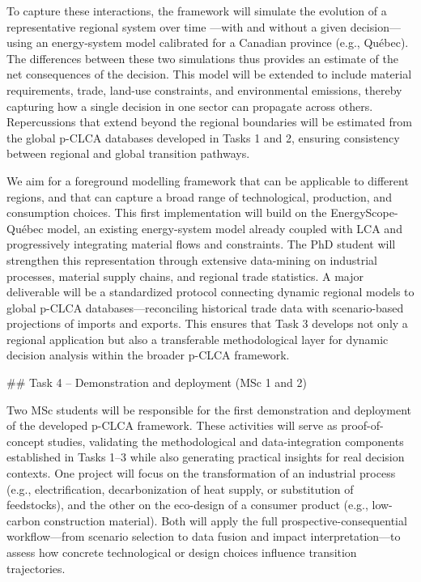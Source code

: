 \documentclass[compact]{nserc} %
\begin{document}
\begin{markdown}
To capture these interactions, the framework will simulate the evolution of a representative regional system over time ---with and without a given decision--- using an energy-system model calibrated for a Canadian province (e.g., Québec). The differences between these two simulations thus provides an estimate of the net consequences of the decision. This model will be extended to include material requirements, trade, land-use constraints, and environmental emissions, thereby capturing how a single decision in one sector can propagate across others. Repercussions that extend beyond the regional boundaries will be estimated from the global p-CLCA databases developed in Tasks 1 and 2, ensuring consistency between regional and global transition pathways.

We aim for a foreground modelling framework that can be applicable to different regions, and that can capture a broad range of technological, production, and consumption choices. This first implementation will build on the EnergyScope-Québec model, an existing energy-system model already coupled with LCA and progressively integrating material flows and constraints. The PhD student will strengthen this representation through extensive data-mining on industrial processes, material supply chains, and regional trade statistics. A major deliverable will be a standardized protocol connecting dynamic regional models to global p-CLCA databases—reconciling historical trade data with scenario-based projections of imports and exports. This ensures that Task 3 develops not only a regional application but also a transferable methodological layer for dynamic decision analysis within the broader p-CLCA framework.


## Task 4 -- Demonstration and deployment (MSc 1 and 2)

Two MSc students will be responsible for the first demonstration and deployment of the developed p-CLCA framework. These activities will serve as proof-of-concept studies, validating the methodological and data-integration components established in Tasks 1–3 while also generating practical insights for real decision contexts. One project will focus on the transformation of an industrial process (e.g., electrification, decarbonization of heat supply, or substitution of feedstocks), and the other on the eco-design of a consumer product (e.g., low-carbon construction material). Both will apply the full prospective-consequential workflow—from scenario selection to data fusion and impact interpretation—to assess how concrete technological or design choices influence transition trajectories.


\end{markdown}
\end{document}
